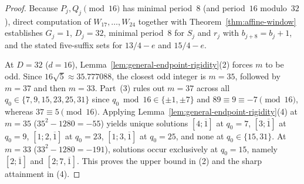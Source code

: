 \documentclass[11pt]{amsart}
\theoremstyle{definition}
\theoremstyle{remark}
\numberwithin{equation}{section}
\begin{document}
\begin{proof}
Because $P_j,Q_j\pmod{16}$ has minimal period~$8$ (and period~$16$ modulo~$32$),
direct computation of $W_{17},\ldots,W_{24}$ together with
Theorem~\ref{thm:affine-window} establishes $G_j=1$, $D_j=32$, minimal
period~$8$ for $S_j$ and $r_j$ with $b_{j+8}=b_j+1$, and the stated five-suffix
sets for $13/4-e$ and $15/4-e$.

At $D=32$ ($d=16$), Lemma~\ref{lem:general-endpoint-rigidity}(2) forces $m$ to
be odd. Since $16\sqrt5\approx35.777088$, the closest odd integer is $m=35$,
followed by $m=37$ and then $m=33$. Part~(3) rules out $m=37$ across all
$q_0\in\{7,9,15,23,25,31\}$ since $q_0\bmod16\in\{\pm1,\pm7\}$ and
$89\equiv9\equiv-7\pmod{16}$, whereas $37\equiv5\pmod{16}$. Applying
Lemma~\ref{lem:general-endpoint-rigidity}(4) at $m=35$ ($35^2-1280=-55$)
yields unique solutions $[4;\overline1]$ at $q_0=7$, $[3;\overline1]$ at
$q_0=9$, $[1;2,\overline1]$ at $q_0=23$, $[1;3,\overline1]$ at $q_0=25$, and
none at $q_0\in\{15,31\}$. At $m=33$ ($33^2-1280=-191$), solutions occur
exclusively at $q_0=15$, namely $[2;\overline1]$ and $[2;7,\overline1]$.
This proves the upper bound in (2) and the sharp attainment in (4).


\end{proof}
\end{document}
